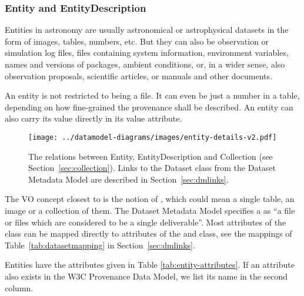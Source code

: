 \subsubsection{Entity and EntityDescription}

Entities in astronomy are usually astronomical or astrophysical datasets in the 
form of images, tables, numbers, etc. But they can also be observation or 
simulation log files, files containing system information, environment
variables, names and versions of packages, ambient conditions, or, in a wider
sense, also observation proposals, scientific  articles, or manuals and other
documents. 

An entity is not restricted to being a file. 
It can even be just a number in a table, depending on how fine-grained the 
provenance shall be described.
An entity can also carry its value directly in its value attribute.

\begin{figure}[h]
\centering
\texttt{[image: ../datamodel-diagrams/images/entity-details-v2.pdf]}
\caption[Relations between Entity, EntityDescription and Collection]{The relations between Entity, EntityDescription and Collection (see Section~\ref{sec:collection}). 
Links to the Dataset class from the Dataset Metadata Model are described in Section~\ref{sec:dmlinks}.}
\label{fig:entity-details}
\end{figure}

The VO concept closest to  is the notion of , which
could mean a single  table, an image or a collection of them. The Dataset
Metadata Model  \citep{std:DatasetDM} specifies a  as ``a file or
files which  are considered to be a single deliverable''.  Most attributes of
the  class can be mapped directly to attributes of the
 and  class, see the mappings of 
Table~\ref{tab:datasetmapping} in Section~\ref{sec:dmlinks}.


Entities have the attributes given in Table 
\ref{tab:entity-attributes}. If an attribute also exists in the W3C 
Provenance Data Model, we list its name in the second column.


